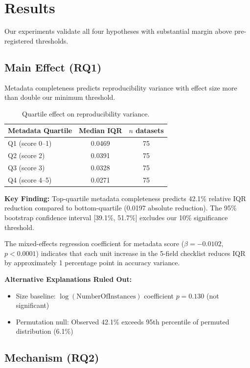 \section{Results}

Our experiments validate all four hypotheses with substantial margin above pre-registered thresholds.

\subsection{Main Effect (RQ1)}

Metadata completeness predicts reproducibility variance with effect size more than double our minimum threshold.

\begin{table}[h]
\centering
\begin{tabular}{@{}lcc@{}}
\toprule
Metadata Quartile & Median IQR & $n$ datasets \\
\midrule
Q1 (score 0--1) & 0.0469 & 75 \\
Q2 (score 2) & 0.0391 & 75 \\
Q3 (score 3) & 0.0328 & 75 \\
Q4 (score 4--5) & 0.0271 & 75 \\
\bottomrule
\end{tabular}
\caption{Quartile effect on reproducibility variance.}
\label{tab:quartile}
\end{table}

\textbf{Key Finding:} Top-quartile metadata completeness predicts 42.1\% relative IQR reduction compared to bottom-quartile (0.0197 absolute reduction). The 95\% bootstrap confidence interval [39.1\%, 51.7\%] excludes our 10\% significance threshold.

The mixed-effects regression coefficient for metadata score ($\beta = -0.0102$, $p < 0.0001$) indicates that each unit increase in the 5-field checklist reduces IQR by approximately 1 percentage point in accuracy variance.

\textbf{Alternative Explanations Ruled Out:}
\begin{itemize}
    \item Size baseline: $\log(\text{NumberOfInstances})$ coefficient $p = 0.130$ (not significant)
    \item Permutation null: Observed 42.1\% exceeds 95th percentile of permuted distribution (6.1\%)
\end{itemize}

\subsection{Mechanism (RQ2)}

